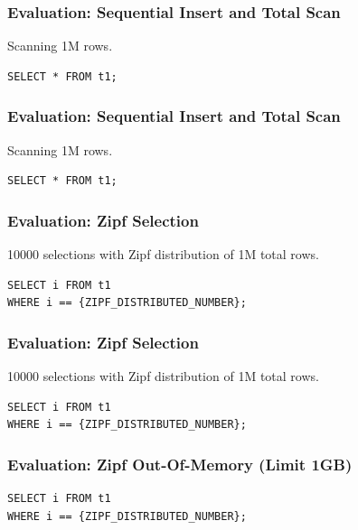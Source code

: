 \documentclass[aspectratio=43]{beamer}
\begin{document}
\begin{frame}[fragile]
    \frametitle{Evaluation: Sequential Insert and Total Scan}
Scanning 1M rows.

\begin{lstlisting}[style=SQL]
SELECT * FROM t1;
\end{lstlisting}
\scalebox{0.9}{
    
}
\end{frame}


\begin{frame}[fragile]
    \frametitle{Evaluation: Sequential Insert and Total Scan}
Scanning 1M rows.

\begin{lstlisting}[style=SQL]
SELECT * FROM t1;
\end{lstlisting}
\scalebox{0.9}{
    
}
\end{frame}


\begin{frame}[fragile]
    \frametitle{Evaluation: Zipf Selection}
10000 selections with Zipf distribution of 1M total rows.

\begin{lstlisting}[style=SQL]
SELECT i FROM t1 
WHERE i == {ZIPF_DISTRIBUTED_NUMBER};
\end{lstlisting}

\scalebox{0.9}{
    
}
\end{frame}


\begin{frame}[fragile]
    \frametitle{Evaluation: Zipf Selection}
10000 selections with Zipf distribution of 1M total rows.

\begin{lstlisting}[style=SQL]
SELECT i FROM t1 
WHERE i == {ZIPF_DISTRIBUTED_NUMBER};
\end{lstlisting}
   

\scalebox{0.9}{  

 }
\end{frame}

\begin{frame}[fragile]
    \frametitle{Evaluation: Zipf Out-Of-Memory (Limit 1GB)}
\begin{lstlisting}[style=SQL]
SELECT i FROM t1 
WHERE i == {ZIPF_DISTRIBUTED_NUMBER};
\end{lstlisting}

\scalebox{0.9}{

}
\end{frame}
\end{document}
